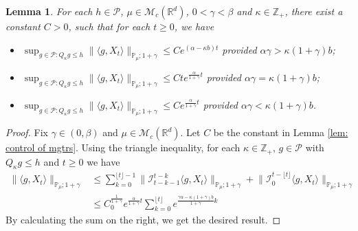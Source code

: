 \documentclass[12pt,oneside,english]{amsart}
\theoremstyle{plain}
\newtheorem{lem}[thm]{Lemma}
\theoremstyle{definition}
\numberwithin{equation}{section}
\begin{document}
\begin{lem}
\label{lem: control moment}
	For each $h \in \mathcal P$, $\mu \in \mathcal M_c(\mathbb{R}^d)$, $0<\gamma < \beta$ and $\kappa \in \mathbb Z_+$, there exist a constant $C > 0$, such that for each $t\geq 0$, we have
\begin{itemize}
\item[(1)]
    $\sup_{g\in \mathcal P: Q_\kappa g \leq h}\|\langle g,X_t\rangle\|_{\mathbb{P}_{\mu};1+\gamma}\leq C e^{(\alpha-\kappa b)t}$ provided $\alpha\gamma > \kappa (1+\gamma)b$;
\item[(2)]
    $\sup_{g\in \mathcal P: Q_\kappa g \leq h}\|\langle g,X_t\rangle\|_{\mathbb{P}_{\mu};1+\gamma}\leq C te^{\frac{\alpha}{1+\gamma}t}$ provided $\alpha\gamma = \kappa (1+\gamma)b$;
\item[(3)]
    $\sup_{g\in \mathcal P: Q_\kappa g \leq h} \|\langle g,X_t\rangle\|_{\mathbb{P}_{\mu};1+\gamma}\leq C e^{\frac{\alpha}{1+\gamma}t}$ provided $\alpha\gamma < \kappa (1+\gamma)b$.
\end{itemize}
\end{lem}
\begin{proof}
    Fix $\gamma \in (0,\beta)$ and $\mu \in \mathcal M_c(\mathbb R^d)$.
    Let $C$ be the constant in Lemma \ref{lem: control of mgtrs}.
    Using the triangle inequality, for each $\kappa\in \mathbb Z_+$, $g \in \mathcal P$ with $Q_\kappa g \leq h$ and $t\geq 0$ we have
\begin{align}
    \|\langle g,X_t\rangle\|_{\mathbb P_\mu;1+\gamma}
    &\leq \sum_{k=0}^{\lfloor t\rfloor - 1}\big\| \mathcal{I}_{t-k-1}^{t-k}\langle g,X_t\rangle \big\|_{\mathbb P_\mu;1+\gamma}+\big\| \mathcal{I}_{0}^{t-\lfloor t \rfloor}\langle g,X_t\rangle  \big\|_{\mathbb P_\mu;1+\gamma}
    \\ &\leq C_0^{\frac{1}{1+\gamma}} e^{\frac{\alpha}{1+\gamma}t} \sum_{k=0}^{\lfloor t\rfloor} e^{\frac{\gamma\alpha-\kappa (1+\gamma)b}{1+\gamma} k}
\end{align}
    By calculating the sum on the right, we get the desired result.
\end{proof}
\end{document}
